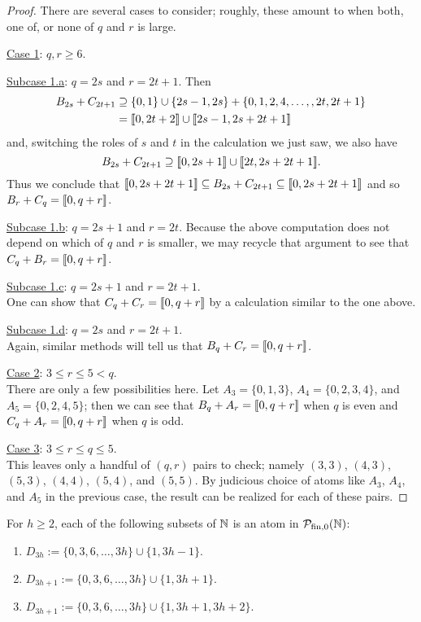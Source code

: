 \begin{proof}
	There are several cases to consider; roughly, these amount to when both, one of, or none of $q$ and $r$ is large.
	
	\underline{Case 1}: $q,r \ge 6$. 
	
	\underline{Subcase 1.a}: $q = 2s$ and $r = 2t+1$.
	Then 
	\begin{align*}
	B_{2s} + C_{2t+1} 
	&\supseteq \{0,1\}\cup\{2s-1,2s\} + \{0,1,2,4,\dots, ,2t,2t+1\} \\
	&= \llbracket 0, 2t+2 \rrbracket \cup \llbracket 2s-1,2s+2t+1 \rrbracket
	\end{align*}
	and, switching the roles of $s$ and $t$ in the calculation we just saw, we also have 
	\[B_{2s}+C_{2t+1} \supseteq \llbracket 0,2s+1 \rrbracket \cup \llbracket 2t,2s+2t+1 \rrbracket.\]
	Thus we conclude that $\llbracket 0,2s+2t+1 \rrbracket \subseteq B_{2s}+C_{2t+1} \subseteq \llbracket 0,2s+2t+1 \rrbracket$ and so $B_r + C_q = \llbracket 0,q+r \rrbracket$.
	
	\underline{Subcase 1.b}: $q = 2s+1$ and $r = 2t$.
	Because the above computation does not depend on which of $q$ and $r$ is smaller, we may recycle that argument to see that $C_q + B_r = \llbracket 0,q+r \rrbracket$.
	
	\underline{Subcase 1.c}: $q = 2s+1$ and $r = 2t+1$.\\
	One can show that $C_q + C_r = \llbracket 0,q+r \rrbracket$ by a calculation similar to the one above.
	
	\underline{Subcase 1.d}: $q = 2s$ and $r = 2t+1$. \\
	Again, similar methods will tell us that $B_q + C_r = \llbracket 0,q+r \rrbracket$.
	
	\underline{Case 2}: $3 \le r \le 5 < q$.\\
	There are only a few possibilities here.
	Let $A_3 = \{0,1,3\}$, $A_4 = \{0,2,3,4\}$, and $A_5 = \{0,2,4,5\}$; then we can see that $B_q +A_r = \llbracket 0,q+r \rrbracket$ when $q$ is even and $C_q + A_r = \llbracket 0,q+r \rrbracket$ when $q$ is odd.
	
	\underline{Case 3}: $3\le r\le q \le 5$.\\
	This leaves only a handful of $(q,r)$ pairs to check; namely $(3,3)$, $(4,3)$, $(5,3)$, $(4,4)$, $(5,4)$, and $(5,5)$.
	By judicious choice of atoms like $A_3$, $A_4$, and $A_5$ in the previous case, the result can be realized for each of these pairs.
\end{proof}

\begin{prop} \label{prop:3-congruence atoms}
	For $h\ge 2$, each of the following subsets of $\mathbb{N}$ is an atom in ${\mathcal{P}_{\textrm{fin},0}(\mathbb{N})}$:
	\begin{enumerate}[label={\rm (\roman{*})}]
		\item $D_{3h} := \{0,3,6,\dots, 3h\} \cup \{ 1, 3h-1 \}$.
		\item $D_{3h+1} := \{0,3,6,\dots, 3h\} \cup \{ 1, 3h+1 \}$.
		\item $D_{3h+1} := \{0,3,6,\dots, 3h\} \cup \{ 1, 3h+1, 3h+2 \}$.
	\end{enumerate}
\end{prop}

